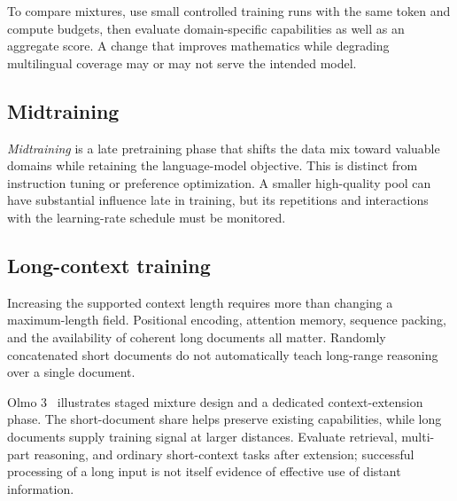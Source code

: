 To compare mixtures, use small controlled training runs with the same token and compute budgets, then evaluate domain-specific capabilities as well as an aggregate score. A change that improves mathematics while degrading multilingual coverage may or may not serve the intended model.

\subsection{Midtraining}
\emph{Midtraining} is a late pretraining phase that shifts the data mix toward valuable domains while retaining the language-model objective. This is distinct from instruction tuning or preference optimization. A smaller high-quality pool can have substantial influence late in training, but its repetitions and interactions with the learning-rate schedule must be monitored.


\subsection{Long-context training}
Increasing the supported context length requires more than changing a maximum-length field. Positional encoding, attention memory, sequence packing, and the availability of coherent long documents all matter. Randomly concatenated short documents do not automatically teach long-range reasoning over a single document.


Olmo 3~\cite{olmo3} illustrates staged mixture design and a dedicated context-extension phase. The short-document share helps preserve existing capabilities, while long documents supply training signal at larger distances. Evaluate retrieval, multi-part reasoning, and ordinary short-context tasks after extension; successful processing of a long input is not itself evidence of effective use of distant information.

\FloatBarrier
